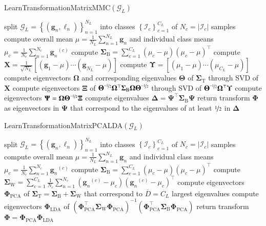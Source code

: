 \documentclass[10pt,a4paper]{llncs}
\newcommand{\gC}{\ensuremath{C}} %
\newcommand{\gD}{\ensuremath{D}} %
\newcommand{\gDELTA}{\ensuremath{\gB{\Delta}}} %
\newcommand{\gG}{\ensuremath{\mathcal{G}}} %
\newcommand{\gGn}[1]{\ensuremath{\gB{g}_{#1}}} %
\newcommand{\gGnc}[2]{\ensuremath{\gGn{#1}^{(#2)}}} %
\newcommand{\gIc}[1]{\ensuremath{\mathcal{I}_{#1}}} %
\newcommand{\gLAMBDAn}[1]{\ensuremath{\ell_{#1}}} %
\newcommand{\gM}{\ensuremath{\mu}} %
\newcommand{\gMc}[1]{\ensuremath{\gM_{#1}}} %
\newcommand{\gN}{\ensuremath{N}} %
\newcommand{\gNc}[1]{\ensuremath{\gN_{#1}}} %
\newcommand{\gPHI}{\ensuremath{\gB{\Phi}}} %
\newcommand{\gPSI}{\ensuremath{\gB{\Psi}}} %
\newcommand{\gSIGMAc}[1]{\ensuremath{\gB{\Sigma}_{#1}}} %
\newcommand{\gSIGMAb}{\ensuremath{\gSIGMAc{\mathrm{B}}}} %
\newcommand{\gSIGMAw}{\ensuremath{\gSIGMAc{\mathrm{W}}}} %
\newcommand{\gSIGMAt}{\ensuremath{\gSIGMAc{\mathrm{T}}}} %
\newcommand{\gTHETA}{\ensuremath{\gB{\Theta}}}
\newcommand{\gXI}{\ensuremath{\gB{\Xi}}}
\newcommand{\gUPSILON}{\ensuremath{\gB{\Upsilon}}}
\newcommand{\gCHI}{\ensuremath{\gB{X}}}
\newcommand{\gOMEGA}{\ensuremath{\gB{\Omega}}}
\newcommand{\gB}[1]{\ensuremath{\mathbf{#1}}} %
\newcommand{\gO}[1]{\ensuremath{\overline{#1}}} %
\newcommand{\gL}[1]{\ensuremath{{#1}_L}} %
\begin{document}
\begin{algorithm}[ht]
\caption{LearnTransformationMatrixMMC$\left(\gL{\gG}\right)$}
\label{a1}
\begin{algorithmic}[1]
  \State split $\gL{\gG}=\left\{\left(\gGn{n},\gLAMBDAn{n}\right)\right\}_{n=1}^{\gL{\gN}}$ into classes $\left\{\gIc{c}\right\}_{c=1}^{\gL{\gC}}$ of $\gNc{c}=\left|\gIc{c}\right|$ samples
  \State compute overall mean $\gM=\frac{1}{\gL{\gN}}\sum_{n=1}^{\gL{\gN}}\gGn{n}$ and individual class means $\gMc{c}=\frac{1}{\gNc{c}}\sum_{n=1}^{\gNc{c}}\gGnc{n}{c}$
  \State compute $\gSIGMAb=\sum_{c=1}^{\gL{\gC}}\left(\gMc{c}-\gM\right)\left(\gMc{c}-\gM\right)^\top$
  \State compute $\gCHI=\frac{1}{\sqrt{\gL{\gN}}}\left[\left(\gGn{1}-\gM\right)\cdots\left(\gGn{\gL{\gN}}-\gM\right)\right]$
  \State compute $\gUPSILON=\left[\left(\gMc{1}-\gM\right)\cdots\left(\gMc{\gL{\gC}}-\gM\right)\right]$
  \State compute eigenvectors $\gOMEGA$ and corresponding eigenvalues $\gTHETA$ of $\gSIGMAt$ through SVD of $\gCHI$
  \State compute eigenvectors $\gXI$ of $\gTHETA^{\nicefrac{-1}{2}}\gOMEGA^\top\gSIGMAb\gOMEGA\gTHETA^{\nicefrac{-1}{2}}$ through SVD of $\gTHETA^{\nicefrac{-1}{2}}\gOMEGA^\top\gUPSILON$
  \State compute eigenvectors $\gPSI=\gOMEGA\gTHETA^{\nicefrac{-1}{2}}\gXI$
  \State compute eigenvalues $\gDELTA=\gPSI^\top\gSIGMAb\gPSI$
  \State return transform $\gPHI$ as eigenvectors in $\gPSI$ that correspond to the eigenvalues of at least $\nicefrac{1}{2}$ in $\gDELTA$
\end{algorithmic}
\end{algorithm}
\vspace{-15pt}
\begin{algorithm}[ht]
\caption{LearnTransformationMatrixPCALDA$\left(\gL{\gG}\right)$}
\label{a2}
\begin{algorithmic}[1]
  \State split $\gL{\gG}=\left\{\left(\gGn{n},\gLAMBDAn{n}\right)\right\}_{n=1}^{\gL{\gN}}$ into classes $\left\{\gIc{c}\right\}_{c=1}^{\gL{\gC}}$ of $\gNc{c}=\left|\gIc{c}\right|$ samples
  \State compute overall mean $\gM=\frac{1}{\gL{\gN}}\sum_{n=1}^{\gL{\gN}}\gGn{n}$ and individual class means $\gMc{c}=\frac{1}{\gNc{c}}\sum_{n=1}^{\gNc{c}}\gGnc{n}{c}$
  \State compute $\gSIGMAb=\sum_{c=1}^{\gL{\gC}}\left(\gMc{c}-\gM\right)\left(\gMc{c}-\gM\right)^\top$
  \State compute $\gSIGMAw=\sum_{c=1}^{\gL{\gC}}\frac{1}{\gNc{c}}\sum_{n=1}^{\gNc{c}}\left(\gGnc{n}{c}-\gMc{c}\right)\left(\gGnc{n}{c}-\gMc{c}\right)^\top$
  \State compute eigenvectors $\gPHI_\mathrm{PCA}$ of $\gSIGMAt=\gSIGMAb+\gSIGMAw$ that correspond to $\gO{\gD}=\gL{\gC}$ largest eigenvalues
  \State compute eigenvectors $\gPHI_\mathrm{LDA}$ of $(\gPHI_\mathrm{PCA}^\top\gSIGMAw\gPHI_\mathrm{PCA})^{-1}(\gPHI_\mathrm{PCA}^\top\gSIGMAb\gPHI_\mathrm{PCA})$
  \State return transform $\gPHI=\gPHI_\mathrm{PCA}\gPHI_\mathrm{LDA}$
\end{algorithmic}
\end{algorithm}
\end{document}
